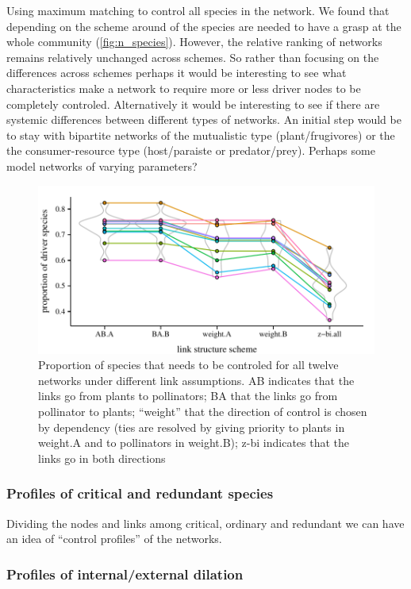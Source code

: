 Using maximum matching to control all species in the network. We found that depending on the scheme around of the species are needed to have a grasp at the whole community (\autoref{fig:n_species}). However, the relative ranking of networks remains relatively unchanged across schemes. So rather than focusing on the differences across schemes perhaps it would be interesting to see what characteristics make a network to require more or less driver nodes to be completely controled. Alternatively it would be interesting to see if there are systemic differences between different types of networks. An initial step would be to stay with bipartite networks of the mutualistic type (plant/frugivores) or the the consumer-resource type (host/paraiste or predator/prey). Perhaps some model networks of varying parameters?

\begin{figure}
\centering
\includegraphics{figures/fig--002}
\caption{\label{fig:n_species} Proportion of species that needs to be controled for all twelve networks under different link assumptions. AB indicates that the links go from plants to pollinators; BA that the links go from pollinator to plants; ``weight'' that the direction of control is chosen by dependency (ties are resolved by giving priority to plants in weight.A and to pollinators in weight.B); z-bi indicates that the links go in both directions}
\end{figure}

\subsubsection*{Profiles of critical and redundant species}

Dividing the nodes and links among critical, ordinary and redundant we can have an idea of ``control profiles'' of the networks. 

\subsubsection*{Profiles of internal/external dilation}

